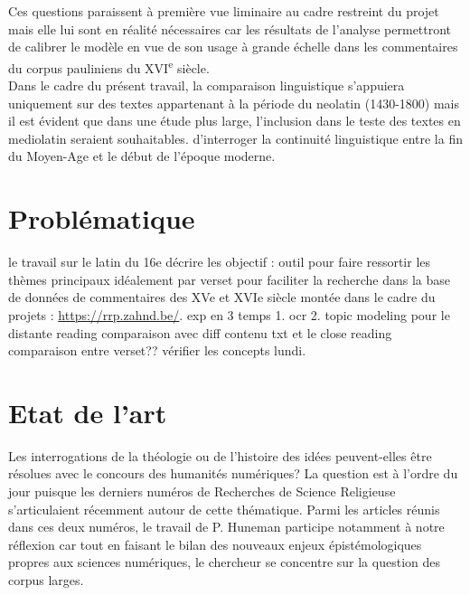 \documentclass[11pt,french]{article}
\begin{document}
Ces questions paraissent à première vue liminaire au cadre restreint du projet mais elle lui sont en réalité nécessaires car les résultats de l'analyse permettront de calibrer le modèle en vue de son usage à grande échelle dans les commentaires du corpus pauliniens du XVI\textsuperscript{e} siècle.\\ Dans le cadre du présent travail, la comparaison linguistique s'appuiera uniquement sur des textes appartenant à la période du neolatin (1430-1800) mais il est évident que dans une étude plus large, l'inclusion dans le teste des textes en mediolatin seraient souhaitables. d'interroger la continuité linguistique entre la fin du Moyen-Age et le début de l'époque moderne.\par 

\section{Problématique}

le travail sur le latin du 16e
décrire les objectif : outil pour faire ressortir les thèmes principaux idéalement par verset pour faciliter la recherche dans la base de données de commentaires des XVe et  XVIe siècle montée dans le cadre du projets : \href{https://rrp.zahnd.be/}{https://rrp.zahnd.be/}. 
exp en 3 temps 1. ocr 2. topic modeling pour le distante reading comparaison avec diff contenu txt et le close reading comparaison entre verset?? vérifier les concepts lundi. 


\section{Etat de l'art}

Les interrogations de la théologie ou de l'histoire des idées peuvent-elles être résolues avec le concours des humanités numériques? La question est à l'ordre du jour puisque les derniers numéros de Recherches de Science Religieuse s'articulaient récemment autour de cette thématique\cite{goujonIntelligenceArtificielleDefi2023a,goujonHumanitesNumeriquesTheologie2024b}. Parmi les articles réunis dans ces deux numéros, le travail de P. Huneman participe notamment à notre réflexion car tout en faisant le bilan des nouveaux enjeux épistémologiques propres aux sciences numériques, le chercheur se concentre sur la question des corpus larges\cite{hunemanQueFontHumanites2024a}. 
\end{document}
